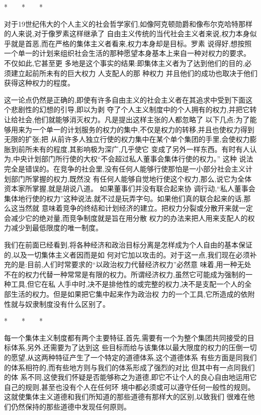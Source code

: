 ﻿\documentclass[12pt]{article}
\begin{document}
*　　*　　*

对于19世纪伟大的个人主义的社会哲学家们,如像阿克顿勋爵和像布尔克哈特那样的人来说,对于像罗素这样继承了
自由主义传统的当代社会主义者来说,权力本身似乎就是首恶,而在严格的集体主义者看来,权力本身却是目标。罗素
说得好,想按照一个单一的计划来组织社会生活的那种愿望本身基本上来自一种对权力的要求。 不仅如此,它甚至更
多地是这个事实的结果:即集体主义者为了达到他们的目的,必须建立起前所未有的巨大权力 \myrule 人支配人的那
种权力 \myrule 并且他们的成功也取决于他们获得这种权力的程度。

这一论点仍然是正确的,即使有许多自由主义的社会主义者在其追求中受到下面这个悲剧性的幻想的引导,即以为剥
夺了个人主义制度中的个人拥有的权力,并把它转让给社会,他们就能够消灭权力。凡是提出这样主张的人都忽略了
以下几点:为了能够用来为一个单一的计划服务的权力的集中,不仅是权力的转移,并且也使权力得到无限的扩张;把
从前许多人独立行使的权力集中在某个单个集团的手里,会使权力膨胀到前所未有的程度,其影响极为深广,几乎使它
变成了另外一样东西。有时有人认为,中央计划部门所行使的大权``不会超过私人董事会集体行使的权力。'' 这种
说法完全是错误的。在竞争的社会里,没有任何人能够行使那怕是一小部分社会主义计划部门所掌握的权力,既然没
有任何人能够自觉地行使这个权力,那么,说它为全体资本家所掌握,就是胡说八道。 如果董事们并没有联合起来协
调行动,``私人董事会集体地行使的权力''这种说法,就不过是玩弄字句。如果他们真的联合起来的话,那么这当然就
意味着竞争的终结和计划经济的建立。把权力分裂或分散开来就一定会减少它的绝对量,而竞争制度就是旨在用分散
权力的办法来把人用来支配人的权力减少到最低限度的唯一制度。

我们在前面已经看到,将各种经济和政治目标分离是怎样成为个人自由的基本保证的,以及一切集体主义者因而是如
何对它加以攻击的。对于这一点,我们现在必须补充的是:目前,人们时常要求的``以政治权力代替经济权力''必然意
味着,用一种无处不在的权力代替一种常常是有限的权力。所谓经济权力,虽然它可能成为强制的一种工具,但它在私
人手中时,决不是排他性的或完整的权力,决不是支配一个人的全部生活的权力。但是如果把它集中起来作为政治权
力的一个工具,它所造成的依附性就与奴隶制度没有什么区别了。

*　　*　　*

每一个集体主义制度都有两个主要特征,首先,需要有一个为整个集团共同接受的目标体系,另外,还需要为了达到这
些目标而给与该集体以最大限度的权力的压倒一切的愿望,从这两种特征产生了一个特定的道德体系,这个道德体系
有些方面是同我们的体系相符的,而有些地方则与我们的体系形成了强烈的对比 \myrule 但其中有一点同我们的体
系不同,这使我们怀疑是否能够称之为道德,即它不让个人的良心自由地运用它自己的规则,甚至也没有个人在任何环
境中都必须或可以遵守任何一般性的规则。这就使集体主义道德和我们所知道的那些道德有那样大的区别,以致我们
很难在他们仍然保持的那些道德中发现任何原则。
\end{document}
